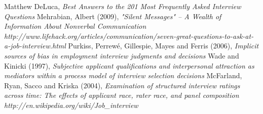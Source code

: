 \documentclass[a4paper,12pt]{report}
\begin{document}
\begin{thebibliography}{9}
  Matthew DeLuca,
  \emph{Best Answers to the 201 Most Frequently Asked Interview Questions}
  Mehrabian, Albert (2009),
  \emph{"Silent Messages" – A Wealth of Information About Nonverbal Communication}
  \emph{http://www.lifehack.org/articles/communication/seven-great-questions-to-ask-at-a-job-interview.html}
  Purkiss, Perrewé, Gillespie, Mayes and Ferris (2006),
  \emph{Implicit sources of bias in employment interview judgments and decisions}
  Wade and Kinicki (1997),
  \emph{Subjective applicant qualifications and interpersonal attraction as mediators within a process model of interview selection decisions}
  McFarland, Ryan, Sacco and Kriska (2004),
  \emph{Examination of structured interview ratings across time: The effects of applicant race, rater race, and panel composition}
  \emph{http://en.wikipedia.org/wiki/Job\_interview}
\end{thebibliography}

\printindex
\end{document}
